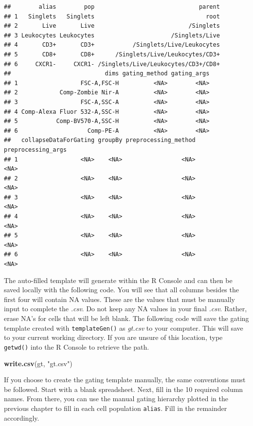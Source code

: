 \documentclass[]{book}
\newenvironment{Shaded}{\begin{snugshade}}{\end{snugshade}}
\newcommand{\KeywordTok}[1]{\textcolor[rgb]{0.13,0.29,0.53}{\textbf{#1}}}
\newcommand{\NormalTok}[1]{#1}
\newcommand{\StringTok}[1]{\textcolor[rgb]{0.31,0.60,0.02}{#1}}
\begin{document}
\begin{verbatim}
##        alias        pop                              parent
## 1   Singlets   Singlets                                root
## 2       Live       Live                           /Singlets
## 3 Leukocytes Leukocytes                      /Singlets/Live
## 4       CD3+       CD3+           /Singlets/Live/Leukocytes
## 5       CD8+       CD8+      /Singlets/Live/Leukocytes/CD3+
## 6     CXCR1-     CXCR1- /Singlets/Live/Leukocytes/CD3+/CD8+
##                           dims gating_method gating_args
## 1                  FSC-A,FSC-H          <NA>        <NA>
## 2            Comp-Zombie Nir-A          <NA>        <NA>
## 3                  FSC-A,SSC-A          <NA>        <NA>
## 4 Comp-Alexa Fluor 532-A,SSC-H          <NA>        <NA>
## 5           Comp-BV570-A,SSC-H          <NA>        <NA>
## 6                    Comp-PE-A          <NA>        <NA>
##   collapseDataForGating groupBy preprocessing_method preprocessing_args
## 1                  <NA>    <NA>                 <NA>               <NA>
## 2                  <NA>    <NA>                 <NA>               <NA>
## 3                  <NA>    <NA>                 <NA>               <NA>
## 4                  <NA>    <NA>                 <NA>               <NA>
## 5                  <NA>    <NA>                 <NA>               <NA>
## 6                  <NA>    <NA>                 <NA>               <NA>
\end{verbatim}

The auto-filled template will generate within the R Console and can then be saved locally with the following code. You will see that all columns besides the first four will contain NA values. These are the values that must be manually input to complete the \emph{.csv}. Do not keep any NA values in your final \emph{.csv}. Rather, erase NA's for cells that will be left blank. The following code will save the gating template created with \texttt{templateGen()} as \emph{gt.csv} to your computer. This will save to your current working directory. If you are unsure of this location, type \texttt{getwd()} into the R Console to retrieve the path.

\begin{Shaded}
\begin{Highlighting}[]
\KeywordTok{write.csv}\NormalTok{(gt, }\StringTok{"gt.csv"}\NormalTok{)}
\end{Highlighting}
\end{Shaded}

If you choose to create the gating template manually, the same conventions must be followed. Start with a blank spreadsheet. Next, fill in the 10 required column names. From there, you can use the manual gating hierarchy plotted in the previous chapter to fill in each cell population \texttt{alias}. Fill in the remainder accordingly.
\end{document}
